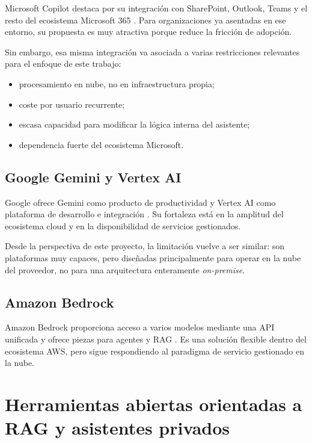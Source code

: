 Microsoft Copilot destaca por su integración con SharePoint, Outlook, Teams y el resto del ecosistema Microsoft 365 \cite{microsoftCopilot3652026}. Para organizaciones ya asentadas en ese entorno, su propuesta es muy atractiva porque reduce la fricción de adopción.

Sin embargo, esa misma integración va asociada a varias restricciones relevantes para el enfoque de este trabajo:

\begin{itemize}
    \item procesamiento en nube, no en infraestructura propia;
    \item coste por usuario recurrente;
    \item escasa capacidad para modificar la lógica interna del asistente;
    \item dependencia fuerte del ecosistema Microsoft.
\end{itemize}

\subsection{Google Gemini y Vertex AI}

Google ofrece Gemini como producto de productividad y Vertex AI como plataforma de desarrollo e integración \cite{googleGeminiWorkspace2024,googleVertexAiGenAI2025}. Su fortaleza está en la amplitud del ecosistema cloud y en la disponibilidad de servicios gestionados.

Desde la perspectiva de este proyecto, la limitación vuelve a ser similar: son plataformas muy capaces, pero diseñadas principalmente para operar en la nube del proveedor, no para una arquitectura enteramente \textit{on-premise}.

\subsection{Amazon Bedrock}

Amazon Bedrock proporciona acceso a varios modelos mediante una API unificada y ofrece piezas para agentes y RAG \cite{awsBedrock2026}. Es una solución flexible dentro del ecosistema AWS, pero sigue respondiendo al paradigma de servicio gestionado en la nube.

\section[Herramientas abiertas]{Herramientas abiertas orientadas a RAG y asistentes privados}

